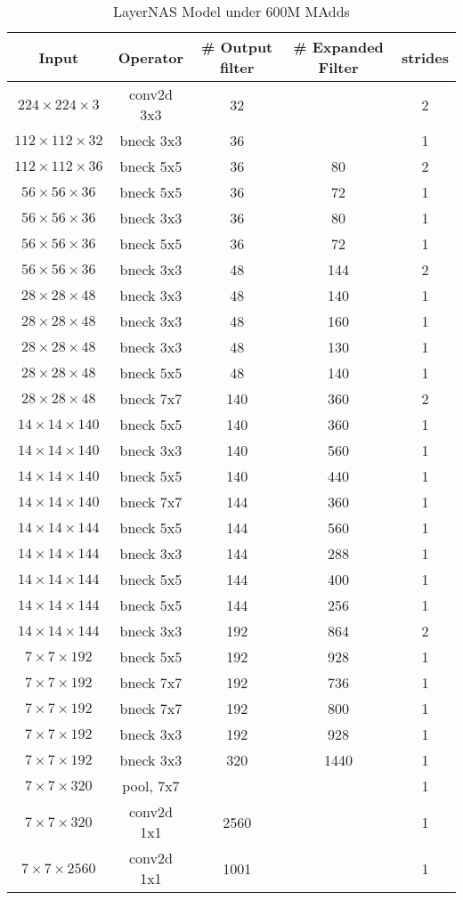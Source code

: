 \begin{table}
\caption{LayerNAS Model under 600M MAdds} 
\begin{center}

\begin{tabular}[hp]{c|c|c|c|c}
\hline
\hline
 Input &Operator  &\# Output filter &\# Expanded Filter &strides\\ 
\hline
 $224\times224\times3$ &conv2d 3x3 &32 & &2 \\
\hline
 $112\times112\times32$ &bneck 3x3 &36 & &1 \\
\hline
 $112\times112\times36$ &bneck 5x5 &36 &80 &2 \\
 $56\times56\times36$ &bneck 5x5 &36 &72 &1 \\
 $56\times56\times36$ &bneck 3x3 &36 &80 &1 \\
 $56\times56\times36$ &bneck 5x5 &36 &72 &1 \\
\hline
 $56\times56\times36$ &bneck 3x3 &48 &144 &2 \\
 $28\times28\times48$ &bneck 3x3 &48 &140 &1 \\
 $28\times28\times48$ &bneck 3x3 &48 &160 &1 \\
 $28\times28\times48$ &bneck 3x3 &48 &130 &1 \\
 $28\times28\times48$ &bneck 5x5 &48 &140 &1 \\
\hline
 $28\times28\times48$ &bneck 7x7 &140 &360 &2 \\
 $14\times14\times140$ &bneck 5x5 &140 &360 &1 \\
 $14\times14\times140$ &bneck 3x3 &140 &560 &1 \\
 $14\times14\times140$ &bneck 5x5 &140 &440 &1 \\
\hline
 $14\times14\times140$ &bneck 7x7 &144 &360 &1 \\
 $14\times14\times144$ &bneck 5x5 &144 &560 &1 \\
 $14\times14\times144$ &bneck 3x3 &144 &288 &1 \\
 $14\times14\times144$ &bneck 5x5 &144 &400 &1 \\
 $14\times14\times144$ &bneck 5x5 &144 &256 &1 \\
 \hline
 $14\times14\times144$ &bneck 3x3 &192 &864 &2 \\
 $7\times7\times192$ &bneck 5x5 &192 &928 &1 \\
 $7\times7\times192$ &bneck 7x7 &192 &736 &1 \\
 $7\times7\times192$ &bneck 7x7 &192 &800 &1 \\
 $7\times7\times192$ &bneck 3x3 &192 &928 &1 \\
 \hline
 $7\times7\times192$ &bneck 3x3 &320 &1440 &1 \\
\hline
 $7\times7\times320$ &pool, 7x7  & & &1\\
 $7\times7\times320$ &conv2d 1x1  &2560 & &1 \\
 $7\times7\times2560$ &conv2d 1x1 &1001 & &1 \\
\hline
\hline

\end{tabular}
\end{center}
\end{table}
